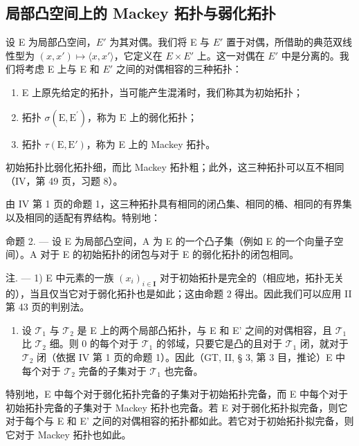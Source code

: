 \subsection{局部凸空间上的 Mackey 拓扑与弱化拓扑}

设 E 为局部凸空间，\(E'\) 为其对偶。我们将 E 与 \(E'\) 置于对偶，所借助的典范双线性型为 \((x, x') \mapsto \langle x, x' \rangle\)，它定义在 \(E \times E'\) 上。这一对偶在 \(E'\) 中是分离的。我们将考虑 E 上与 E 和 \(E'\) 之间的对偶相容的三种拓扑：

\begin{enumerate}
\def\labelenumi{\alph{enumi})}
\item
  E 上原先给定的拓扑，当可能产生混淆时，我们称其为初始拓扑；
\item
  拓扑 \(\sigma(\mathrm{E},\mathrm{E}^{\prime})\)，称为 \(\mathrm{E}\) 上的弱化拓扑；
\item
  拓扑 \(\tau(\mathrm{E},\mathrm{E}')\)，称为 E 上的 Mackey 拓扑。
\end{enumerate}

初始拓扑比弱化拓扑细，而比 Mackey 拓扑粗；此外，这三种拓扑可以互不相同（IV，第 49 页，习题 8）。

由 IV 第 1 页的命题 1，这三种拓扑具有相同的闭凸集、相同的桶、相同的有界集以及相同的适配有界结构。特别地：

命题 2. --- 设 E 为局部凸空间，A 为 E 的一个凸子集（例如 E 的一个向量子空间）。A 对于 E 的初始拓扑的闭包与对于 E 的弱化拓扑的闭包相同。

注. --- 1) E 中元素的一族 \((x_{i})_{i\in\mathbf{I}}\) 对于初始拓扑是完全的（相应地，拓扑无关的），当且仅当它对于弱化拓扑也是如此；这由命题 2 得出。因此我们可以应用 II 第 43 页的判别法。

\begin{enumerate}
\def\labelenumi{\arabic{enumi})}
\setcounter{enumi}{1}
\tightlist
\item
  设 \(\mathcal{T}_1\) 与 \(\mathcal{T}_2\) 是 E 上的两个局部凸拓扑，与 E 和 E' 之间的对偶相容，且 \(\mathcal{T}_1\) 比 \(\mathcal{T}_2\) 细。则 0 的每个对于 \(\mathcal{T}_1\) 的邻域，只要它是凸的且对于 \(\mathcal{T}_1\) 闭，就对于 \(\mathcal{T}_2\) 闭（依据 IV 第 1 页的命题 1）。因此（GT, II, § 3, 第 3 目，推论）E 中每个对于 \(\mathcal{T}_2\) 完备的子集对于 \(\mathcal{T}_1\) 也完备。
\end{enumerate}

特别地，E 中每个对于弱化拓扑完备的子集对于初始拓扑完备，而 E 中每个对于初始拓扑完备的子集对于 Mackey 拓扑也完备。若 E 对于弱化拓扑拟完备，则它对于每个与 E 和 E' 之间的对偶相容的拓扑都如此。若它对于初始拓扑拟完备，则它对于 Mackey 拓扑也如此。

